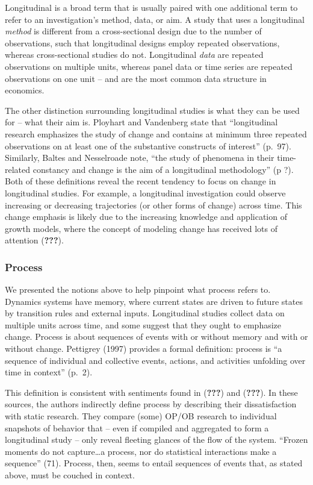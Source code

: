 \documentclass[english,,man]{apa6}
\theoremstyle{definition}
\theoremstyle{definition}
\theoremstyle{definition}
\theoremstyle{remark}
\begin{document}
Longitudinal is a broad term that is usually paired with one additional
term to refer to an investigation's method, data, or aim. A study that
uses a longitudinal \emph{method} is different from a cross-sectional
design due to the number of observations, such that longitudinal designs
employ repeated observations, whereas cross-sectional studies do not.
Longitudinal \emph{data} are repeated observations on multiple units,
whereas panel data or time series are repeated observations on one unit
-- and are the most common data structure in economics.

The other distinction surrounding longitudinal studies is what they can
be used for -- what their aim is. Ployhart and Vandenberg state that
\enquote{longitudinal research emphasizes the study of change and
contains at minimum three repeated observations on at least one of the
substantive constructs of interest} (p.~97). Similarly, Baltes and
Nesselroade note, \enquote{the study of phenomena in their time-related
constancy and change is the aim of a longitudinal methodology} (p ?).
Both of these definitions reveal the recent tendency to focus on change
in longitudinal studies. For example, a longitudinal investigation could
observe increasing or decreasing trajectories (or other forms of change)
across time. This change emphasis is likely due to the increasing
knowledge and application of growth models, where the concept of
modeling change has received lots of attention ({\textbf{???}}).

\hypertarget{process}{%
\subsubsection{Process}\label{process}}

We presented the notions above to help pinpoint what process refers to.
Dynamics systems have memory, where current states are driven to future
states by transition rules and external inputs. Longitudinal studies
collect data on multiple units across time, and some suggest that they
ought to emphasize change. Process is about sequences of events with or
without memory and with or without change. Pettigrey (1997) provides a
formal definition: process is \enquote{a sequence of individual and
collective events, actions, and activities unfolding over time in
context} (p.~2).

This definition is consistent with sentiments found in ({\textbf{???}})
and ({\textbf{???}}). In these sources, the authors indirectly define
process by describing their dissatisfaction with static research. They
compare (some) OP/OB research to individual snapshots of behavior that
-- even if compiled and aggregated to form a longitudinal study -- only
reveal fleeting glances of the flow of the system. \enquote{Frozen
moments do not capture\ldots{}a process, nor do statistical interactions
make a sequence} (71). Process, then, seems to entail sequences of
events that, as stated above, must be couched in context.
\end{document}
